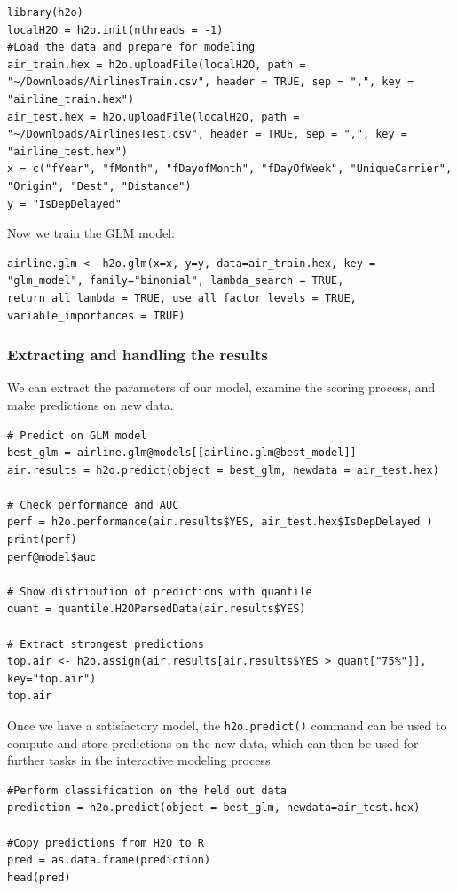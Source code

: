 \begin{lstlisting}[style=R]
library(h2o)
localH2O = h2o.init(nthreads = -1)
#Load the data and prepare for modeling
air_train.hex = h2o.uploadFile(localH2O, path = "~/Downloads/AirlinesTrain.csv", header = TRUE, sep = ",", key = "airline_train.hex")
air_test.hex = h2o.uploadFile(localH2O, path = "~/Downloads/AirlinesTest.csv", header = TRUE, sep = ",", key = "airline_test.hex")
x = c("fYear", "fMonth", "fDayofMonth", "fDayOfWeek", "UniqueCarrier", "Origin", "Dest", "Distance")
y = "IsDepDelayed"
\end{lstlisting}

Now we train the GLM model:

\begin{lstlisting}[style=R]
airline.glm <- h2o.glm(x=x, y=y, data=air_train.hex, key = "glm_model", family="binomial", lambda_search = TRUE, return_all_lambda = TRUE, use_all_factor_levels = TRUE, variable_importances = TRUE)
\end{lstlisting}

\subsubsection{Extracting and handling the results} \label{3.2.1}

We can extract the parameters of our model, examine the scoring process, and make predictions on new data.

\begin{lstlisting}[style=R]
# Predict on GLM model
best_glm = airline.glm@models[[airline.glm@best_model]]
air.results = h2o.predict(object = best_glm, newdata = air_test.hex)

# Check performance and AUC
perf = h2o.performance(air.results$YES, air_test.hex$IsDepDelayed )
print(perf)
perf@model$auc

# Show distribution of predictions with quantile
quant = quantile.H2OParsedData(air.results$YES)

# Extract strongest predictions
top.air <- h2o.assign(air.results[air.results$YES > quant["75%"]], key="top.air")
top.air
\end{lstlisting}

Once we have a satisfactory model, the \texttt{h2o.predict()} command can be used to compute and store predictions on the new data, which can then be used for further tasks in the interactive modeling process.
\begin{lstlisting}[style=R]
#Perform classification on the held out data
prediction = h2o.predict(object = best_glm, newdata=air_test.hex)

#Copy predictions from H2O to R
pred = as.data.frame(prediction)
head(pred)
\end{lstlisting}


